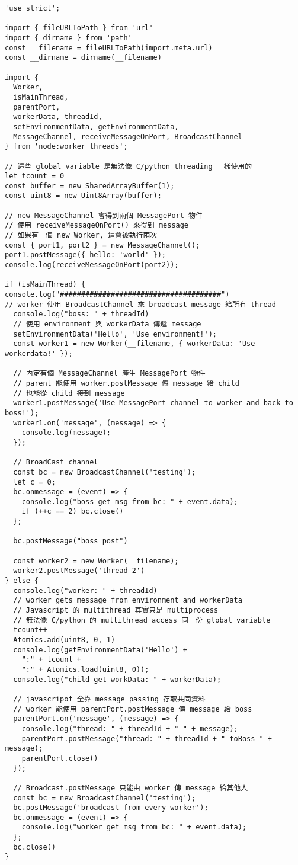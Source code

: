   \begin{verbatim}
'use strict';

import { fileURLToPath } from 'url'
import { dirname } from 'path'
const __filename = fileURLToPath(import.meta.url)
const __dirname = dirname(__filename)

import {
  Worker,
  isMainThread,
  parentPort,
  workerData, threadId,
  setEnvironmentData, getEnvironmentData,
  MessageChannel, receiveMessageOnPort, BroadcastChannel
} from 'node:worker_threads';

// 這些 global variable 是無法像 C/python threading 一樣使用的
let tcount = 0
const buffer = new SharedArrayBuffer(1);
const uint8 = new Uint8Array(buffer);

// new MessageChannel 會得到兩個 MessagePort 物件
// 使用 receiveMessageOnPort() 來得到 message
// 如果有一個 new Worker, 這會被執行兩次
const { port1, port2 } = new MessageChannel();
port1.postMessage({ hello: 'world' });
console.log(receiveMessageOnPort(port2));

if (isMainThread) {
console.log("######################################")
// worker 使用 BroadcastChannel 來 broadcast message 給所有 thread
  console.log("boss: " + threadId)
  // 使用 environment 與 workerData 傳遞 message
  setEnvironmentData('Hello', 'Use environment!');
  const worker1 = new Worker(__filename, { workerData: 'Use workerdata!' });

  // 內定有個 MessageChannel 產生 MessagePort 物件
  // parent 能使用 worker.postMessage 傳 message 給 child
  // 也能從 child 接到 message
  worker1.postMessage('Use MessagePort channel to worker and back to boss!');
  worker1.on('message', (message) => {
    console.log(message);
  });

  // BroadCast channel
  const bc = new BroadcastChannel('testing');
  let c = 0;
  bc.onmessage = (event) => {
    console.log("boss get msg from bc: " + event.data);
    if (++c == 2) bc.close()
  };

  bc.postMessage("boss post")

  const worker2 = new Worker(__filename);
  worker2.postMessage('thread 2')
} else {
  console.log("worker: " + threadId)
  // worker gets message from environment and workerData
  // Javascript 的 multithread 其實只是 multiprocess
  // 無法像 C/python 的 multithread access 同一份 global variable
  tcount++
  Atomics.add(uint8, 0, 1)
  console.log(getEnvironmentData('Hello') +
    ":" + tcount +
    ":" + Atomics.load(uint8, 0));
  console.log("child get workData: " + workerData);

  // javascripot 全靠 message passing 存取共同資料
  // worker 能使用 parentPort.postMessage 傳 message 給 boss
  parentPort.on('message', (message) => {
    console.log("thread: " + threadId + " " + message);
    parentPort.postMessage("thread: " + threadId + " toBoss " + message);
    parentPort.close()
  });

  // Broadcast.postMessage 只能由 worker 傳 message 給其他人
  const bc = new BroadcastChannel('testing');
  bc.postMessage('broadcast from every worker');
  bc.onmessage = (event) => {
    console.log("worker get msg from bc: " + event.data);
  };
  bc.close()
}
  \end{verbatim}
